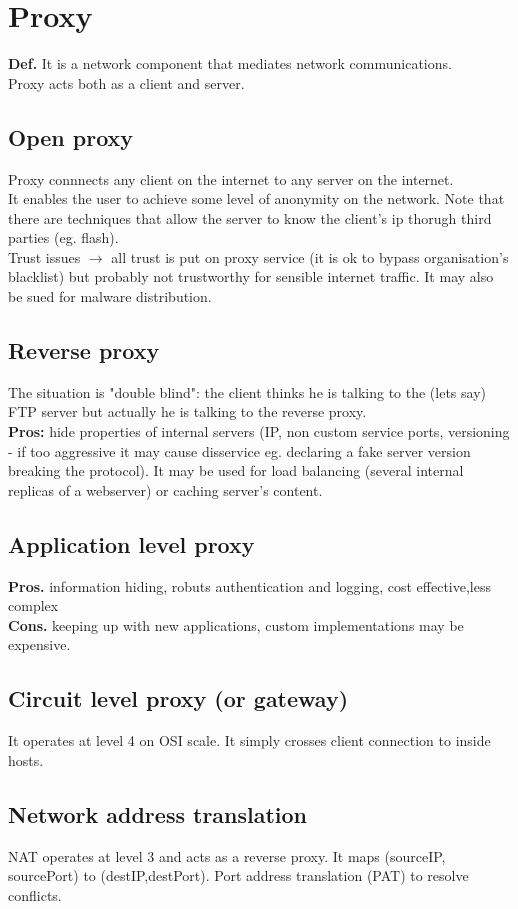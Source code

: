 \documentclass[10pt,a4paper]{book}
\begin{document}
\section{Proxy}
\textbf{Def.} It is a network component that mediates network communications.\\
Proxy acts both as a client and server.
\subsection{Open proxy}
Proxy connnects any client on the internet to any server on the internet.\\
It enables the user to achieve some level of anonymity on the network. Note that there are techniques that allow the server to know the client's ip thorugh third parties (eg. flash). \\
Trust issues $\to$ all trust is put on proxy service (it is ok to bypass organisation's blacklist) but probably not trustworthy for sensible internet traffic. It may also be sued for malware distribution.
\subsection{Reverse proxy}
The situation is "double blind": the client thinks he is talking to the (lets say) FTP server but actually he is talking to the reverse proxy.\\
\textbf{Pros:} hide properties of internal servers (IP, non custom service ports, versioning - if too aggressive it may cause disservice eg. declaring a fake server version breaking the protocol). It may be used for load balancing (several internal replicas of a webserver) or caching server's content.
\subsection{Application level proxy}
\textbf{Pros.} information hiding, robuts authentication and logging, cost effective,less complex\\
\textbf{Cons.} keeping up with new applications, custom implementations may be expensive.
\subsection{Circuit level proxy (or gateway)}
It operates at level 4 on OSI scale. It simply crosses client connection to inside hosts.
\subsection{Network address translation}
NAT operates at level 3 and acts as a reverse proxy. It maps (sourceIP, sourcePort) to (destIP,destPort). Port address translation (PAT) to resolve conflicts.
\end{document}
